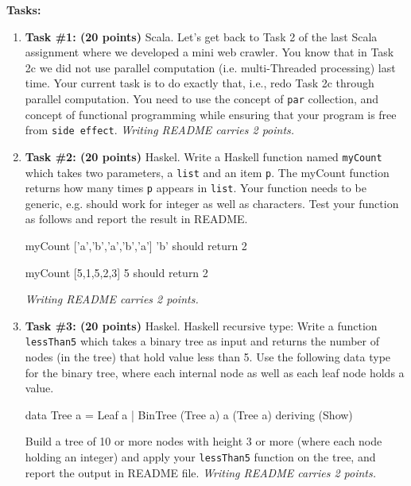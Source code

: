 \documentclass[paper=letter, fontsize=11pt]{scrartcl} %
\begin{document}
    \textbf{Tasks:}
    \begin{enumerate}

        \item \textbf{Task \#1: (20 points)} Scala. Let's get back to Task 2 of the last Scala assignment where we developed a mini web crawler. 
You know that in Task 2c we did not use parallel computation (i.e. multi-Threaded processing) last time. 
Your current task is to do exactly that, i.e., redo Task 2c through parallel computation.  
You need to use the concept of \texttt{par} collection, and concept of functional programming while ensuring that your program is free from \texttt{side effect}. 
\emph{Writing README carries 2 points.}

        \item \textbf{Task \#2: (20 points)} Haskel. Write a Haskell function named \texttt{myCount} 
which takes two parameters, a \texttt{list} and an item \texttt{p}. 
The myCount function returns how many times \texttt{p} appears in \texttt{list}. 
Your function needs to be generic, e.g. should work for integer as well as characters. 
Test your function as follows and report the result in README.

myCount  ['a','b','a','b','a'] 'b'  should return 2

myCount  [5,1,5,2,3]  5  should return 2

\emph{Writing README carries 2 points.}
        \item \textbf{Task \#3: (20 points)} Haskel. Haskell recursive type: 
Write a function \texttt{lessThan5} which takes a binary tree as input and returns 
the number of nodes (in the tree) that hold value less than 5. Use the following data type for the binary tree, 
where each internal node as well as each leaf node holds a value.

data Tree a = Leaf a | BinTree (Tree a) a (Tree a)  deriving (Show)

Build a tree of 10 or more nodes with height 3 or more 
(where each node holding an integer) and apply your \texttt{lessThan5} 
function on the tree, and report the output in README file. \emph{Writing README carries 2 points.}

    
    \end{enumerate}
\end{document}
